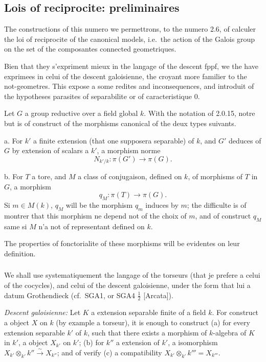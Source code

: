 \documentclass[12pt,a4paper]{article}
\theoremstyle{plain}
\theoremstyle{definition}
\theoremstyle{remark}
\newcommand{\simto}{\xrightarrow{\sim}}
\begin{document}
\subsection{Lois of reciprocite: preliminaires}

The constructions of this numero we permettrons, to the numero 2.6, of calculer the loi of reciprocite of the canonical models, i.e.~the action of the Galois group on the set of the composantes connected geometriques.

Bien that they s'expriment mieux in the langage of the descent fppf, we the have exprimees in celui of the descent galoisienne, the croyant more familier to the not-geometres. This expose a some redites and inconsequences, and introduit of the hypotheses parasites of separabilite or of caracteristique 0.

Let $G$ a group reductive over a field global $k$. With the notation of 2.0.15, notre but is of construct of the morphisms canonical of the deux types suivants.

a. For $k'$ a finite extension (that one supposera separable) of $k$, and $G'$ deduces of $G$ by extension of scalars a $k'$, a morphism norme
\begin{equation}\label{eq:2.4.0.1}
N_{k'/k}: \pi(G') \to \pi(G).
\end{equation}

b. For $T$ a tore, and $M$ a class of conjugaison, defined on $k$, of morphisms of $T$ in $G$, a morphism
\begin{equation}\label{eq:2.4.0.2}
q_M: \pi(T) \to \pi(G).
\end{equation}
Si $m \in M(k)$, $q_M$ will be the morphism $q_m$ induces by $m$; the difficulte is of montrer that this morphism ne depend not of the choix of $m$, and of construct $q_M$ same si $M$ n'a not of representant defined on $k$.

The properties of fonctorialite of these morphisms will be evidentes on leur definition.

\subsubsection{}

We shall use systematiquement the langage of the torseurs (that je prefere a celui of the cocycles), and celui of the descent galoisienne, under the form that lui a datum Grothendieck (cf.~SGA1, or SGA4 $\frac{1}{2}$ [Arcata]).

\textit{Descent galoisienne:} Let $K$ a extension separable finite of a field $k$. For construct a object $X$ on $k$ (by example a torseur), it is enough to construct (a) for every extension separable $k'$ of $k$, such that there exists a morphism of $k$-algebra of $K$ in $k'$, a object $X_{k'}$ on $k'$; (b) for $k''$ a extension of $k'$, a isomorphism $X_{k'} \otimes_{k'} k'' \simto X_{k''}$; and of verify (c) a compatibility $X_{k'} \otimes_{k'} k''' = X_{k'''}$.
\end{document}
